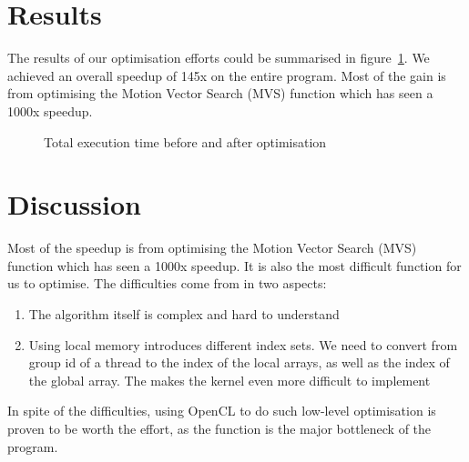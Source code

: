 \documentclass[a4paper]{article}
\begin{document}
\section{Results}
The results of our optimisation efforts could be summarised in
figure~\ref{fig:before_after_bar}. We achieved an overall speedup of
145x on the entire program. Most of the gain is from optimising the
Motion Vector Search (MVS) function which has seen a 1000x speedup.
\begin{figure}[h]
  \centering
  \caption{Total execution time before and after optimisation}
  \label{fig:before_after_bar}
\end{figure}

\section{Discussion}
Most of the speedup is from optimising the Motion Vector Search (MVS)
function which has seen a 1000x speedup. It is also the most difficult
function for us to optimise. The difficulties come from in two
aspects:
\begin{enumerate}
\item The algorithm itself is complex and hard to understand
\item Using local memory introduces different index sets. We need to
  convert from group id of a thread to the index of the local arrays,
  as well as the index of the global array. The makes the kernel even
  more difficult to implement
\end{enumerate}

In spite of the difficulties, using OpenCL to do such low-level
optimisation is proven to be worth the effort, as the function is the
major bottleneck of the program.
\end{document}
